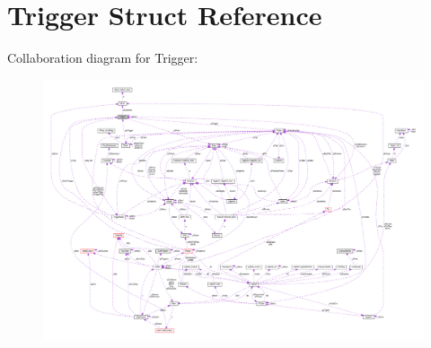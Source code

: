 \hypertarget{structTrigger}{}\section{Trigger Struct Reference}
\label{structTrigger}


Collaboration diagram for Trigger\+:\nopagebreak
\begin{figure}[H]
\begin{center}
\leavevmode
\includegraphics[width=350pt]{structTrigger__coll__graph}
\end{center}
\end{figure}
